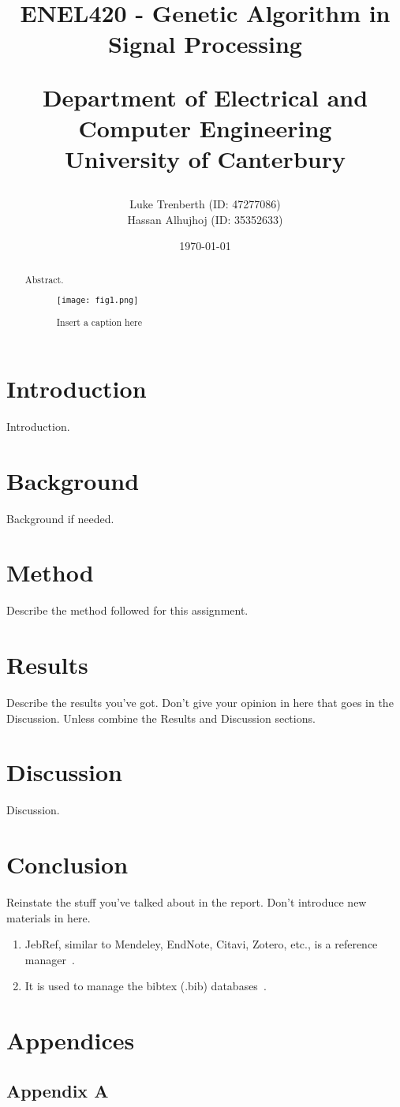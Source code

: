 \documentclass[a4paper, 12pt]{article}
\title{
    ENEL420 - Genetic Algorithm in Signal Processing \newline\newline\newline
    \begin{large} 
        Department of Electrical and Computer Engineering\\
        University of Canterbury\\
    \end{large}
}
\author{
    Luke Trenberth (ID: 47277086)\\
    Hassan Alhujhoj (ID: 35352633)\\
    }
\date{\today}
\begin{document}
\maketitle

\begin{abstract}
    Abstract.
    \begin{figure}[h]
        \centering
        \graphicspath{{./wiki/}}
        \texttt{[image: fig1.png]}
        \caption{Insert a caption here}
        \label{fig1.png}
    \end{figure}
\end{abstract}

\tableofcontents
\newpage
{}

\section{Introduction}\label{sec:intro}
    Introduction.

\section{Background}\label{sec:bg}
    Background if needed.

\section{Method}
    Describe the method followed for this assignment.

\section{Results}
    Describe the results you've got. Don't give your opinion in here that goes in the Discussion.
    Unless combine the Results and Discussion sections.

\section{Discussion}
    Discussion.

\section{Conclusion}
    Reinstate the stuff you've talked about in the report. Don't introduce new materials in here.

\newpage

\begin{enumerate}
    \item JebRef, similar to Mendeley, EndNote, Citavi, Zotero, etc., is a reference 
    manager~.
    \item It is used to manage the bibtex (.bib) databases~\cite{Ifeachor1995}.
\end{enumerate}


\renewcommand{\bibname}{References}
\renewcommand{\bibsection}{\section{\bibname}}
\renewcommand{\cite}{\citep}


\section{Appendices}
    \subsection{Appendix A}
\end{document}
